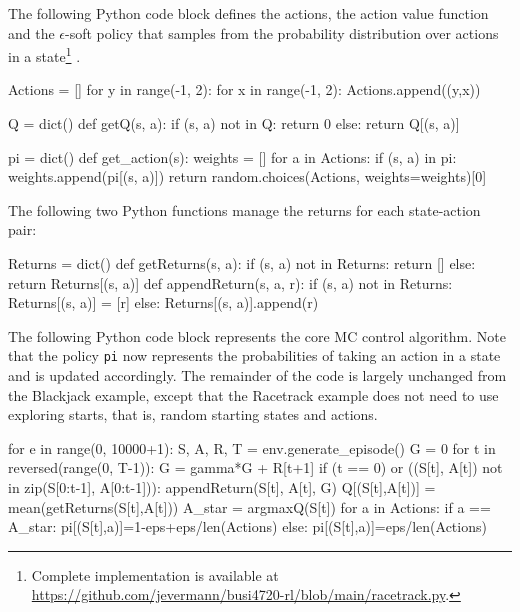 \begin{withcode}
The following Python code block defines the actions, the action value function and the $\epsilon$-soft policy that samples from the probability distribution over actions in a state\footnote{Complete implementation is available at \url{https://github.com/jevermann/busi4720-rl/blob/main/racetrack.py}.}
. 

\begin{pythoncode}
Actions = []
for y in range(-1, 2):
    for x in range(-1, 2):
        Actions.append((y,x))

Q = dict()
def getQ(s, a):
    if (s, a) not in Q:
        return 0
    else:
        return Q[(s, a)]

pi = dict()
def get_action(s):
    weights = []
    for a in Actions:
        if (s, a) in pi:
            weights.append(pi[(s, a)])
    return random.choices(Actions, weights=weights)[0]
\end{pythoncode}

The following two Python functions manage the returns for each state-action pair:

\begin{pythoncode}
Returns = dict()
def getReturns(s, a):
    if (s, a) not in Returns:
        return []
    else:
        return Returns[(s, a)]
def appendReturn(s, a, r):
    if (s, a) not in Returns:
        Returns[(s, a)] = [r]
    else:
        Returns[(s, a)].append(r)
\end{pythoncode}

The following Python code block represents the core MC control algorithm. Note that the policy \texttt{pi} now represents the probabilities of taking an action in a state and is updated accordingly. The remainder of the code is largely unchanged from the Blackjack example, except that the Racetrack example does not need to use exploring starts, that is, random starting states and actions.

\begin{pythoncode}
for e in range(0, 10000+1):
    S, A, R, T = env.generate_episode()
    G = 0
    for t in reversed(range(0, T-1)):
        G = gamma*G + R[t+1]
        if (t == 0) or ((S[t], A[t]) not in zip(S[0:t-1], A[0:t-1])):
            appendReturn(S[t], A[t], G)
            Q[(S[t],A[t])] = mean(getReturns(S[t],A[t]))
            A_star = argmaxQ(S[t])
            for a in Actions:
                if a == A_star:
                    pi[(S[t],a)]=1-eps+eps/len(Actions)
                else:
                    pi[(S[t],a)]=eps/len(Actions)
\end{pythoncode}
\end{withcode}

